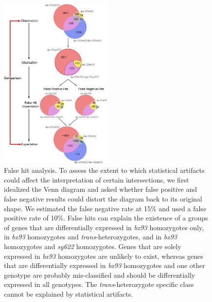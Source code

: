 \documentclass[10pt, twocolumn]{article}
\begin{document}
\begin{figure}
  \includegraphics[width=0.5\textwidth]{../figs/false_hit_analysis.pdf}
  \caption{False hit analysis. To assess the extent to which statistical
  artifacts could affect the interpretation of certain intersections, we
  first idealized the Venn diagram and asked whether false positive and
  false negative results could distort the diagram back to its original
  shape. We estimated the false negative rate at 15\% and used a false positive
  rate of 10\%. False hits can explain the existence of a groups of genes that
  are differentially expressed in \emph{bx93} homozygotes only, in \emph{bx93}
  homozygotes and \emph{trans}-heterozygotes, and in \emph{bx93} homozygotes
  and \emph{sy622} homozygotes. Genes that are solely expressed in \emph{bx93}
  homozygotes are unlikely to exist, whereas genes that are differentially
  expressed in \emph{bx93} homozygotes and one other genotype are probably
  mis-classified and should be differentially expressed in all genotypes. The
  \emph{trans}-heterozygote specific class cannot be explained by statistical
  artifacts.
  }
\label{fig:false_hit}
\end{figure}
\end{document}
